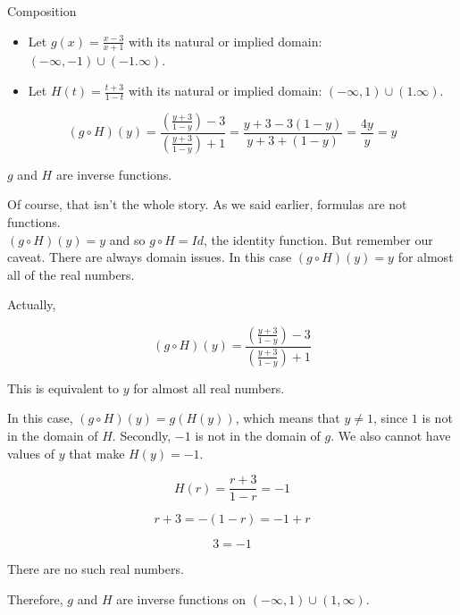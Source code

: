 \documentclass{ximera}
\begin{document}
\begin{example} Composition



\begin{itemize}
\item Let $g(x) = \frac{x-3}{x+1}$ with its natural or implied domain: $(-\infty, -1) \cup (-1. \infty)$. \\

\item Let $H(t) = \frac{t+3}{1-t}$ with its natural or implied domain: $(-\infty, 1) \cup (1. \infty)$.
\end{itemize}



\[
(g \circ H)(y) = \frac{\left( \frac{y+3}{1-y} \right) - 3}{\left(  \frac{y+3}{1-y}\right) + 1} = \frac{y+3-3(1-y)}{y+3+(1-y)} = \frac{4y}{y} = y
\]



$g$ and $H$ are inverse functions.




\end{example}

Of course, that isn't the whole story.  As we said earlier, formulas are not functions. \\

$(g \circ H)(y) = y$ and so $g \circ H = Id$, the identity function.  But remember our caveat.  There are always domain issues.  In this case $(g \circ H)(y) = y$ for almost all of the real numbers.

Actually, 


\[
(g \circ H)(y) = \frac{\left( \frac{y+3}{1-y} \right) - 3}{\left(  \frac{y+3}{1-y}\right) + 1} 
\]


This is equivalent to $y$ for almost all real numbers.


In this case, $(g \circ H)(y) = g(H(y))$, which means that $y \ne 1$, since $1$ is not in the domain of $H$.  Secondly, $-1$ is not in the domain of $g$.  We also cannot have values of $y$ that make $H(y) = -1$.




\[
H(r) = \frac{r+3}{1-r} = -1
\]

\[
r + 3 = -(1-r) = -1 + r
\]


\[
3 = -1
\]


There are no such real numbers.



Therefore, $g$ and $H$ are inverse functions on $(-\infty, 1) \cup (1,\infty)$.
\end{document}
